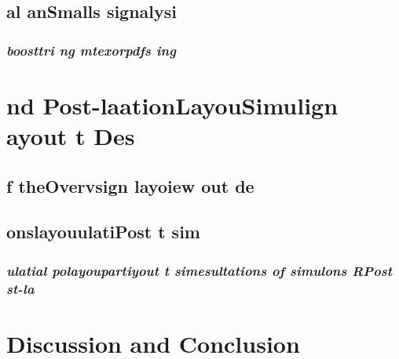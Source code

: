 \documentclass[12pt, letterpaper]{article}
\begin{document}
    \subsection{al anSmalls signalysi}
    \label{sssdf}
        \subsubsection{\emph{boosttri ng mtexorpdfs ing}}
        \label{sdfb}

\section{nd Post-laationLayouSimulign ayout t Des}

    \subsection{f theOvervsign layoiew out de}
    
    \subsection{onslayouulatiPost t sim}
    
        \subsubsection{\emph{ulatial polayoupartiyout t simesultations of simulons RPost st-la}}
        
\section{Discussion and Conclusion}

\newpage


\end{document}
